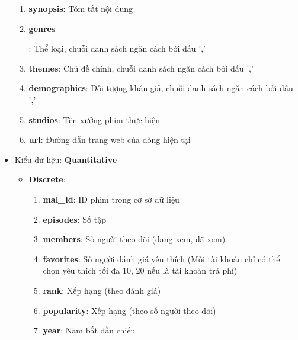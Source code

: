 \begin{itemize}
\begin{enumerate}
            \item \textbf{synopsis}: Tóm tắt nội dung

            \item \hypertarget{line:mal-genres}{\textbf{genres}}: Thể loại, chuỗi danh sách ngăn cách bởi dấu ','

            \item \textbf{themes}: Chủ đề chính, chuỗi danh sách ngăn cách bởi dấu ','

            \item \textbf{demographics}: Đối tượng khán giả, chuỗi danh sách ngăn cách bởi dấu ','

            \item \textbf{studios}: Tên xưởng phim thực hiện

            \item \textbf{url}: Đường dẫn trang web của dòng hiện tại
            
        \end{enumerate}

        \item Kiểu dữ liệu: \textbf{Quantitative} 
        \begin{itemize}
            \item \textbf{Discrete}:

                \begin{enumerate}[resume]
                    \item \textbf{mal\_id}: ID phim trong cơ sở dữ liệu

                    \item  \textbf{episodes}: Số tập


                    \item \textbf{members}: Số người theo dõi (đang xem, đã xem)

                    \item \textbf{favorites}: Số người đánh giá yêu thích (Mỗi tài khoản chỉ có thể chọn yêu thích tối đa 10, 20 nếu là tài khoản trả phí)
                    
                    \item \textbf{rank}: Xếp hạng (theo đánh giá)
                    
                    \item \textbf{popularity}: Xếp hạng (theo số người theo dõi)

                    \item \textbf{year}: Năm bắt đầu chiếu


\end{enumerate}
\end{itemize}
\end{itemize}

